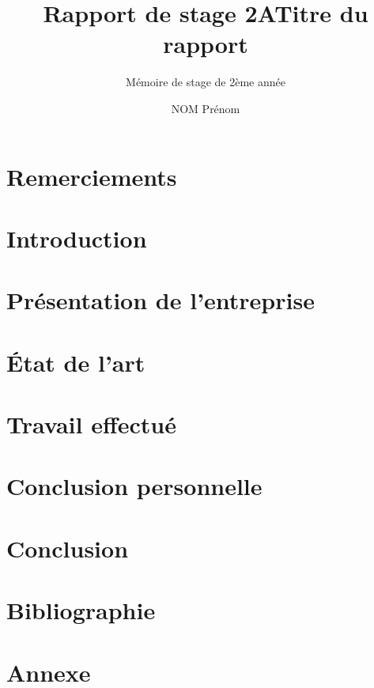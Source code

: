 \documentclass{rapport_de_stage}
\title{Rapport de stage 2A} %
\title{Titre du rapport}
\subtitle{Mémoire de stage de 2ème année}
\author{NOM Prénom}
\begin{document}
\maketitle

\section{Remerciements}

\newpage



\newpage

\toc %



\section{Introduction}

\newpage


\section{Présentation de l'entreprise}

\newpage


\section{État de l'art}

\newpage


\section{Travail effectué}

\newpage


\section{Conclusion personnelle}

\newpage


\section{Conclusion} 

\newpage


\section{Bibliographie}

\newpage


\section{Annexe}

\newpage
\end{document}
